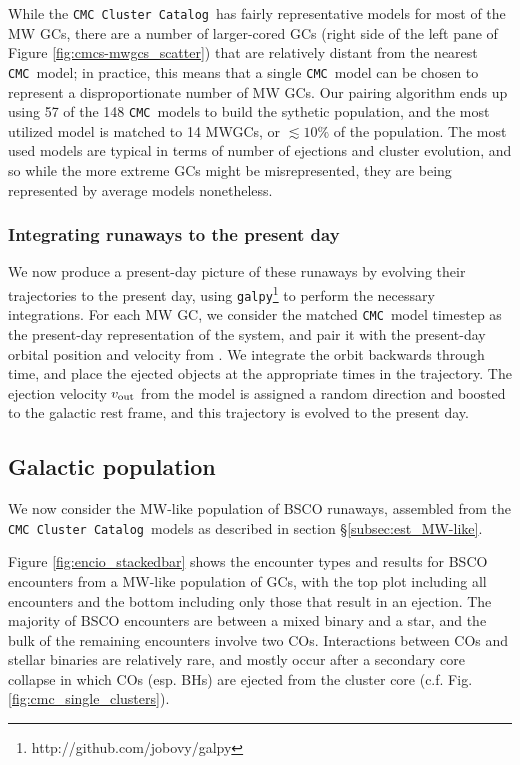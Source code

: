 \documentclass[twocolumn]{aastex631}
\newcommand{\CMC}{\texttt{CMC}}
\newcommand{\CMCcat}{\texttt{CMC Cluster Catalog}}
\begin{document}
While the \CMCcat\ has fairly representative models for most of the MW GCs, there are a number of larger-cored GCs (right side of the left pane of Figure \ref{fig:cmcs-mwgcs_scatter}) that are relatively distant from the nearest \CMC\ model; in practice, this means that a single \CMC\ model can be chosen to represent a disproportionate number of MW GCs.
Our pairing algorithm ends up using 57 of the 148 \CMC\ models to build the sythetic population, and the most utilized model is matched to 14 MWGCs, or $\lesssim10\%$ of the population.
The most used models are typical in terms of number of ejections and cluster evolution, and so while the more extreme GCs might be misrepresented, they are being represented by average models nonetheless.

\subsubsection{Integrating runaways to the present day} \label{subsubsec:galpy}

We now produce a present-day picture of these runaways by evolving their trajectories to the present day, using \texttt{galpy}\footnote{http://github.com/jobovy/galpy} \citep{2015ApJS..216...29B} to perform the necessary integrations.
For each MW GC, we consider the matched \CMC\ model timestep as the present-day representation of the system, and pair it with the present-day orbital position and velocity from \citet{2018MNRAS.478.1520B}.
We integrate the orbit backwards through time, and place the ejected objects at the appropriate times in the trajectory.
The ejection velocity $v_{\rm out}$ from the model is assigned a random direction and boosted to the galactic rest frame, and this trajectory is evolved to the present day.

\subsection{Galactic population} \label{subsec:res_MW-like}

We now consider the MW-like population of BSCO runaways, assembled from the \CMCcat\ models as described in section \S\ref{subsec:est_MW-like}.

Figure \ref{fig:encio_stackedbar} shows the encounter types and results for BSCO encounters from a MW-like population of GCs, with the top plot including all encounters and the bottom including only those that result in an ejection.
The majority of BSCO encounters are between a mixed binary and a star, and the bulk of the remaining encounters involve two COs.
Interactions between COs and stellar binaries are relatively rare, and mostly occur after a secondary core collapse in which COs (esp. BHs) are ejected from the cluster core (c.f. Fig. \ref{fig:cmc_single_clusters}).
\end{document}
